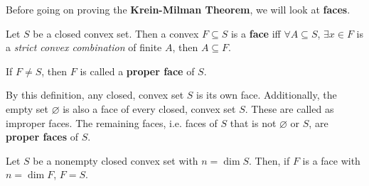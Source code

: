 Before going on proving the  \textbf{Krein-Milman Theorem}, we will look at
\textbf{faces}.

\begin{definition}
  Let \( S \) be a closed convex set. Then a convex \( F \subseteq S \)
  is a \textbf{face} iff \( \forall A \subseteq S \),
  \( \exists x \in F \) is a \textit{strict convex combination} of
  finite \( A \), then \( A \subseteq F \).

  If \( F \neq S \), then \( F \) is called a \textbf{proper face} of \( S \).
\end{definition}

By this definition, any closed, convex set \( S \) is its own face.
Additionally, the empty set \( \varnothing \) is also a face of every closed,
convex set \( S \). These are called as improper faces. The remaining faces,
i.e. faces of \( S \) that is not \( \varnothing \) or \( S \), are
\textbf{proper faces} of \( S \).

\begin{theorem}
\label{thr:No proper faces with full dimensions}
  Let \( S \) be a nonempty closed convex set with \( n = \dim S
  \). Then, if \( F \) is a face with \( n = \dim F \), \( F = S
  \).
\end{theorem}

